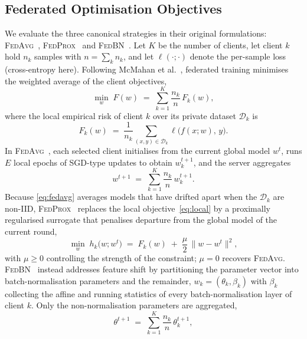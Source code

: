\documentclass[journal]{IEEEtran}
\newcommand{\fedavg}{\textsc{FedAvg}}
\newcommand{\fedprox}{\textsc{FedProx}}
\newcommand{\fedbn}{\textsc{FedBN}}
\begin{document}
\subsection{Federated Optimisation Objectives}
\label{sec:objectives}

We evaluate the three canonical strategies in their original formulations: \fedavg{}~\cite{mcmahan2017fedavg}, \fedprox{}~\cite{li2020fedprox} and \fedbn{}~\cite{li2021fedbn}. Let $K$ be the number of clients, let client $k$ hold $n_k$ samples with $n=\sum_k n_k$, and let $\ell(\cdot;\cdot)$ denote the per-sample loss (cross-entropy here). Following McMahan et al.~\cite{mcmahan2017fedavg}, federated training minimises the weighted average of the client objectives,
\begin{equation}
\min_{w} \; F(w) \;=\; \sum_{k=1}^{K} \frac{n_k}{n}\, F_k(w),
\label{eq:global}
\end{equation}
where the local empirical risk of client $k$ over its private dataset $\mathcal{D}_k$ is
\begin{equation}
F_k(w) \;=\; \frac{1}{n_k} \sum_{(x,y)\in\mathcal{D}_k} \ell\bigl(f(x;w),\, y\bigr).
\label{eq:local}
\end{equation}
In \fedavg{}~\cite{mcmahan2017fedavg}, each selected client initialises from the current global model $w^{t}$, runs $E$ local epochs of SGD-type updates to obtain $w_k^{t+1}$, and the server aggregates
\begin{equation}
w^{t+1} \;=\; \sum_{k=1}^{K} \frac{n_k}{n}\, w_k^{t+1}.
\label{eq:fedavg}
\end{equation}
Because \eqref{eq:fedavg} averages models that have drifted apart when the $\mathcal{D}_k$ are non-IID, \fedprox{}~\cite{li2020fedprox} replaces the local objective~\eqref{eq:local} by a proximally regularised surrogate that penalises departure from the global model of the current round,
\begin{equation}
\min_{w} \; h_k\bigl(w; w^{t}\bigr) \;=\; F_k(w) \;+\; \frac{\mu}{2}\,\bigl\lVert w - w^{t} \bigr\rVert^{2},
\label{eq:fedprox}
\end{equation}
with $\mu \ge 0$ controlling the strength of the constraint; $\mu = 0$ recovers \fedavg{}. \fedbn{}~\cite{li2021fedbn} instead addresses feature shift by partitioning the parameter vector into batch-normalisation parameters and the remainder, $w_k = (\theta_k, \beta_k)$ with $\beta_k$ collecting the affine and running statistics of every batch-normalisation layer of client $k$. Only the non-normalisation parameters are aggregated,
\begin{equation}
\theta^{t+1} \;=\; \sum_{k=1}^{K} \frac{n_k}{n}\, \theta_k^{t+1},
\label{eq:fedbn_a}
\end{equation}
\end{document}
